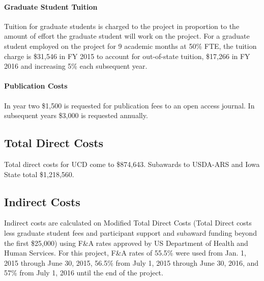 \paragraph{Graduate Student Tuition}
Tuition for graduate students is charged to the project in proportion to the amount of effort the graduate student will work on the project. For a graduate student employed on the project for 9 academic months at 50\% FTE, the tuition charge is \$31,546 in FY 2015 to account for out-of-state tuition, \$17,266 in FY 2016 and increasing 5\% each subsequent year.

\paragraph{Publication Costs}
In year two \$1,500 is requested for publication fees to an open access journal.  In subsequent years \$3,000 is requested annually.

\subsection*{Total Direct Costs}

Total direct costs for UCD come to \$874,643.  Subawards to USDA-ARS and Iowa State total \$1,218,560.

\subsection*{Indirect Costs}
Indirect costs are calculated on Modified Total Direct Costs (Total Direct costs less graduate student fees and participant support and subaward funding beyond the first \$25,000) using F\&A rates approved by US Department of Health and Human Services. For this project, F\&A rates of 55.5\% were used from Jan. 1, 2015 through June 30, 2015, 56.5\% from July 1, 2015 through June 30, 2016, and 57\% from July 1, 2016 until the end of the project.